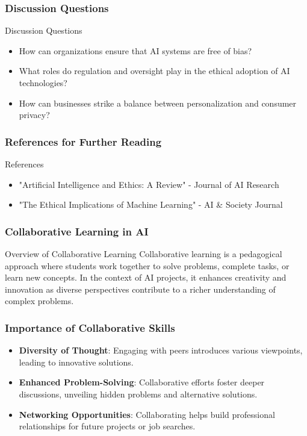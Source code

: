 \documentclass[aspectratio=169]{beamer}
\begin{document}
\begin{frame}[fragile]
    \frametitle{Discussion Questions}
    \begin{block}{Discussion Questions}
        \begin{itemize}
            \item How can organizations ensure that AI systems are free of bias?
            \item What roles do regulation and oversight play in the ethical adoption of AI technologies?
            \item How can businesses strike a balance between personalization and consumer privacy?
        \end{itemize}
    \end{block}
\end{frame}

\begin{frame}[fragile]
    \frametitle{References for Further Reading}
    \begin{block}{References}
        \begin{itemize}
            \item "Artificial Intelligence and Ethics: A Review" - Journal of AI Research
            \item "The Ethical Implications of Machine Learning" - AI \& Society Journal
        \end{itemize}
    \end{block}
\end{frame}

\begin{frame}[fragile]
    \frametitle{Collaborative Learning in AI}
    \begin{block}{Overview of Collaborative Learning}
        Collaborative learning is a pedagogical approach where students work together to solve problems, complete tasks, or learn new concepts. 
        In the context of AI projects, it enhances creativity and innovation as diverse perspectives contribute to a richer understanding of complex problems.
    \end{block}
\end{frame}

\begin{frame}[fragile]
    \frametitle{Importance of Collaborative Skills}
    \begin{itemize}
        \item \textbf{Diversity of Thought}: Engaging with peers introduces various viewpoints, leading to innovative solutions. 
        \item \textbf{Enhanced Problem-Solving}: Collaborative efforts foster deeper discussions, unveiling hidden problems and alternative solutions.
        \item \textbf{Networking Opportunities}: Collaborating helps build professional relationships for future projects or job searches.
    \end{itemize}
\end{frame}
\end{document}
